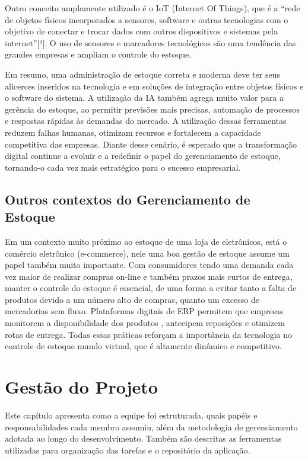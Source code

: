 \documentclass[
	12pt,				%
	openany,			%
	twoside,			%
	a4paper,			%
	english,			%
	brazil				%
	]{abntex2}
\begin{document}
Outro conceito amplamente utilizado é o IoT (Internet Of Things), que é a “rede de objetos físicos incorporados a sensores, software e outras tecnologias com o objetivo de conectar e trocar dados com outros dispositivos e sistemas pela internet”[³]. O uso de sensores e marcadores tecnológicos  são uma tendência das grandes empresas e ampliam o controle do estoque.

Em resumo, uma administração de estoque correta e moderna deve ter seus alicerces inseridos na tecnologia e em soluções de integração entre objetos físicos e o software do sistema. A utilização da IA também agrega muito valor para a gerência do estoque, ao permitir previsões mais precisas, automação de processos e respostas rápidas às demandas do mercado. A utilização dessas ferramentas reduzem falhas humanas, otimizam recursos e fortalecem a capacidade competitiva das empresas. Diante desse cenário, é esperado que a transformação digital continue a evoluir e a redefinir o papel do gerenciamento de estoque, tornando-o cada vez mais estratégico para o sucesso empresarial.

\section{Outros contextos do Gerenciamento de Estoque}
Em um contexto muito próximo ao estoque de uma loja de eletrônicos, está o comércio eletrônico (e-commerce), nele uma boa gestão de estoque assume um papel também muito importante. Com consumidores tendo uma demanda cada vez maior de realizar compras on-line e também prazos mais curtos de entrega, manter o controle do estoque é essencial, de uma forma a evitar tanto a falta de produtos devido a um número alto de compras, quanto um excesso de mercadorias sem fluxo. Plataformas digitais de ERP permitem que empresas monitorem a disponibilidade dos produtos , antecipem reposições e otimizem rotas de entrega. Todas essas práticas reforçam a importância da tecnologia no controle de estoque mundo virtual, que é altamente dinâmico e competitivo.

\chapter{Gestão do Projeto}

Este capítulo apresenta como a equipe foi estruturada, quais papéis e responsabilidades cada membro assumiu, além da metodologia de gerenciamento adotada ao longo do desenvolvimento. Também são descritas as ferramentas utilizadas para organização das tarefas e o repositório da aplicação.
\end{document}

